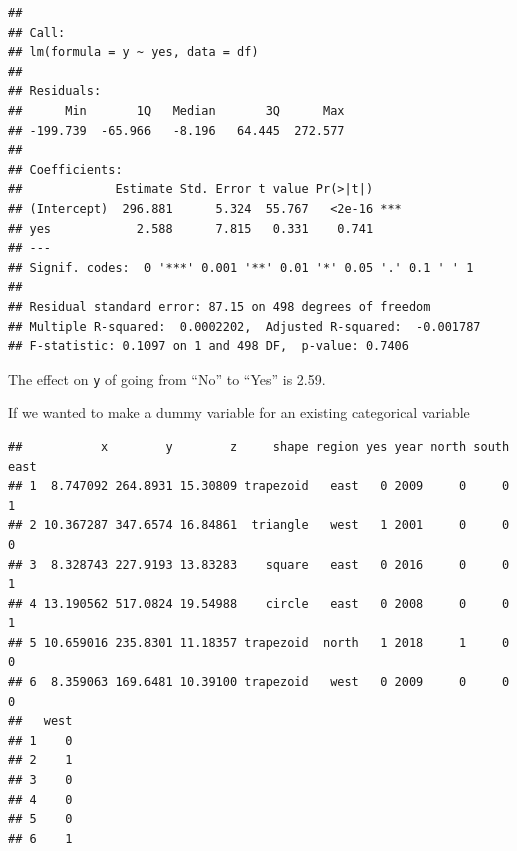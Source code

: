 \documentclass[]{book}
\newenvironment{Shaded}{\begin{snugshade}}{\end{snugshade}}
\newcommand{\KeywordTok}[1]{\textcolor[rgb]{0.13,0.29,0.53}{\textbf{#1}}}
\newcommand{\DecValTok}[1]{\textcolor[rgb]{0.00,0.00,0.81}{#1}}
\newcommand{\StringTok}[1]{\textcolor[rgb]{0.31,0.60,0.02}{#1}}
\newcommand{\OperatorTok}[1]{\textcolor[rgb]{0.81,0.36,0.00}{\textbf{#1}}}
\newcommand{\NormalTok}[1]{#1}
\theoremstyle{definition}
\theoremstyle{definition}
\theoremstyle{definition}
\theoremstyle{remark}
\begin{document}
\begin{verbatim}
## 
## Call:
## lm(formula = y ~ yes, data = df)
## 
## Residuals:
##      Min       1Q   Median       3Q      Max 
## -199.739  -65.966   -8.196   64.445  272.577 
## 
## Coefficients:
##             Estimate Std. Error t value Pr(>|t|)    
## (Intercept)  296.881      5.324  55.767   <2e-16 ***
## yes            2.588      7.815   0.331    0.741    
## ---
## Signif. codes:  0 '***' 0.001 '**' 0.01 '*' 0.05 '.' 0.1 ' ' 1
## 
## Residual standard error: 87.15 on 498 degrees of freedom
## Multiple R-squared:  0.0002202,  Adjusted R-squared:  -0.001787 
## F-statistic: 0.1097 on 1 and 498 DF,  p-value: 0.7406
\end{verbatim}

The effect on \texttt{y} of going from ``No'' to ``Yes'' is 2.59.

If we wanted to make a dummy variable for an existing categorical
variable

\begin{Shaded}
\end{Shaded}

\begin{verbatim}
##           x        y        z     shape region yes year north south east
## 1  8.747092 264.8931 15.30809 trapezoid   east   0 2009     0     0    1
## 2 10.367287 347.6574 16.84861  triangle   west   1 2001     0     0    0
## 3  8.328743 227.9193 13.83283    square   east   0 2016     0     0    1
## 4 13.190562 517.0824 19.54988    circle   east   0 2008     0     0    1
## 5 10.659016 235.8301 11.18357 trapezoid  north   1 2018     1     0    0
## 6  8.359063 169.6481 10.39100 trapezoid   west   0 2009     0     0    0
##   west
## 1    0
## 2    1
## 3    0
## 4    0
## 5    0
## 6    1
\end{verbatim}
\end{document}
